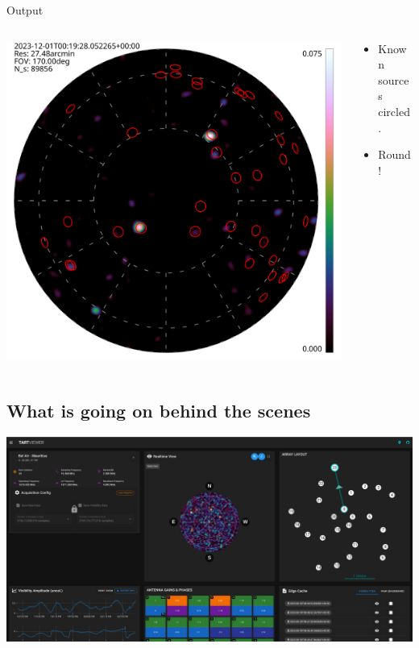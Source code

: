 \documentclass[ignorenonframetext]{beamer}
\begin{document}
\begin{frame}{Output}
\begin{columns}
 \begin{column}{0.7\linewidth}
\includegraphics[width=\linewidth]{images/obs_00000.hdf.png}
 \end{column}
 \begin{column}{0.3\linewidth}
 \begin{itemize}
  \item Known sources circled.
  \item Round!
 \end{itemize}
 \end{column}
\end{columns}
\end{frame}


\subsection{What is going on behind the scenes}

\frame{\tableofcontents[currentsection]}

\begin{frame}
 \includegraphics[width=\linewidth]{../tart_overview/fig/browser_view.png}
\end{frame}
\end{document}
